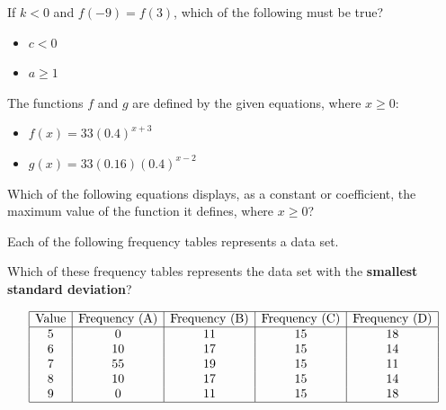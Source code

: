 If \(k < 0\) and \(f(-9) = f(3)\), which of the following must be true?

\begin{itemize}
\item[I] \(c < 0\)
\item[II] \(a \geq 1\)
\end{itemize}

\vspace{0.75em}


\vspace{2em}
\newpage

\noindent\markforreview
\vspace{1em}

The functions \(f\) and \(g\) are defined by the given equations, where \(x \geq 0\):

\begin{itemize}
\item[I] \(f(x) = 33(0.4)^{x+3}\)
\item[II] \(g(x) = 33(0.16)(0.4)^{x-2}\)
\end{itemize}

Which of the following equations displays, as a constant or coefficient, the maximum value of the function it defines, where \(x \geq 0\)?

\vspace{0.75em}


\vspace{2em}
\newpage

\noindent\markforreview
\vspace{1em}

Each of the following frequency tables represents a data set.

Which of these frequency tables represents the data set with the \textbf{smallest standard deviation}?

\[
\begin{array}{|c|c|c|c|c|}
\hline
\text{Value} & \text{Frequency (A)} & \text{Frequency (B)} & \text{Frequency (C)} & \text{Frequency (D)} \\
\hline
5 & 0 & 11 & 15 & 18 \\
6 & 10 & 17 & 15 & 14 \\
7 & 55 & 19 & 15 & 11 \\
8 & 10 & 17 & 15 & 14 \\
9 & 0 & 11 & 15 & 18 \\
\hline
\end{array}
\]

